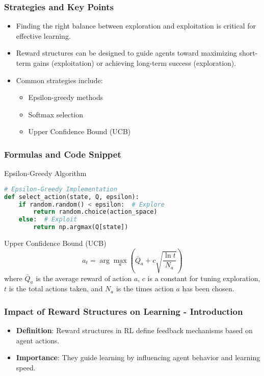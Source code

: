 \documentclass[aspectratio=169]{beamer}
\begin{document}
\begin{frame}[fragile]
    \frametitle{Strategies and Key Points}
    \begin{itemize}
        \item Finding the right balance between exploration and exploitation is critical for effective learning.
        \item Reward structures can be designed to guide agents toward maximizing short-term gains (exploitation) or achieving long-term success (exploration).
        \item Common strategies include:
            \begin{itemize}
                \item Epsilon-greedy methods
                \item Softmax selection
                \item Upper Confidence Bound (UCB)
            \end{itemize}
    \end{itemize}
\end{frame}

\begin{frame}[fragile]
    \frametitle{Formulas and Code Snippet}
    \begin{block}{Epsilon-Greedy Algorithm}
    \begin{lstlisting}[language=Python]
# Epsilon-Greedy Implementation
def select_action(state, Q, epsilon):
    if random.random() < epsilon:  # Explore
        return random.choice(action_space)
    else:  # Exploit
        return np.argmax(Q[state])
    \end{lstlisting}
    \end{block}
    \begin{block}{Upper Confidence Bound (UCB)}
        \begin{equation}
        a_t = \arg \max_a \left( \bar{Q}_a + c \sqrt{\frac{\ln t}{N_a}} \right)
        \end{equation}
        where \( \bar{Q}_a \) is the average reward of action \( a \), \( c \) is a constant for tuning exploration, \( t \) is the total actions taken, and \( N_a \) is the times action \( a \) has been chosen.
    \end{block}
\end{frame}

\begin{frame}[fragile]
    \frametitle{Impact of Reward Structures on Learning - Introduction}
    \begin{itemize}
        \item \textbf{Definition}: Reward structures in RL define feedback mechanisms based on agent actions.
        \item \textbf{Importance}: They guide learning by influencing agent behavior and learning speed.
    \end{itemize}
\end{frame}
\end{document}
